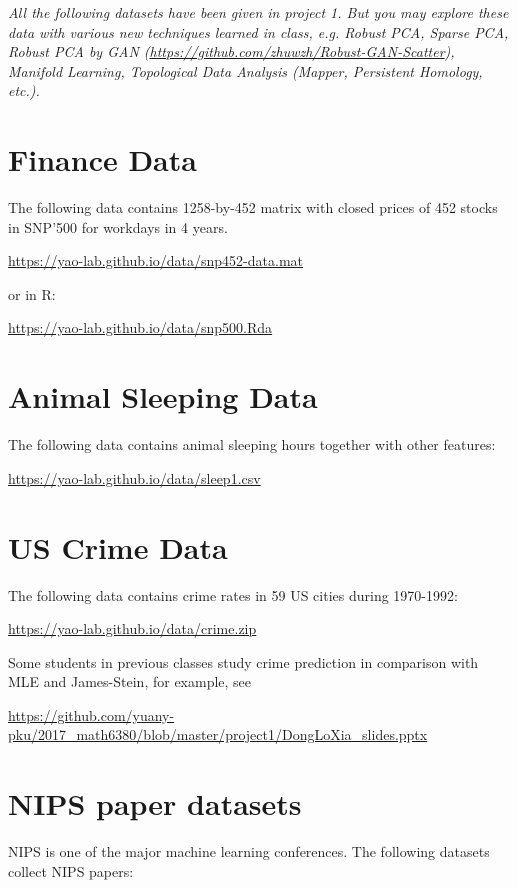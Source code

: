 \documentclass[11pt]{article}
\begin{document}
{\it All the following datasets have been given in project 1. But you may explore these data with various new techniques learned in class, e.g. Robust PCA, Sparse PCA, Robust PCA by GAN (\url{https://github.com/zhuwzh/Robust-GAN-Scatter}), Manifold Learning, Topological Data Analysis (Mapper, Persistent Homology, etc.). }

\section{Finance Data}
The following data contains 1258-by-452 matrix with closed prices of 452 stocks in SNP'500 for workdays in 4 years.

\url{https://yao-lab.github.io/data/snp452-data.mat}

\noindent or in R: 

\url{https://yao-lab.github.io/data/snp500.Rda}


\section{Animal Sleeping Data} The following data contains animal sleeping hours together with other features: 

\url{https://yao-lab.github.io/data/sleep1.csv}

\section{US Crime Data} The following data contains crime rates in 59 US cities during 1970-1992:

\url{https://yao-lab.github.io/data/crime.zip}

\noindent Some students in previous classes study crime prediction in comparison with MLE and James-Stein, for example, see

\url{https://github.com/yuany-pku/2017_math6380/blob/master/project1/DongLoXia_slides.pptx}


\section{NIPS paper datasets}
NIPS is one of the major machine learning conferences. The following datasets collect NIPS papers:
\end{document}
